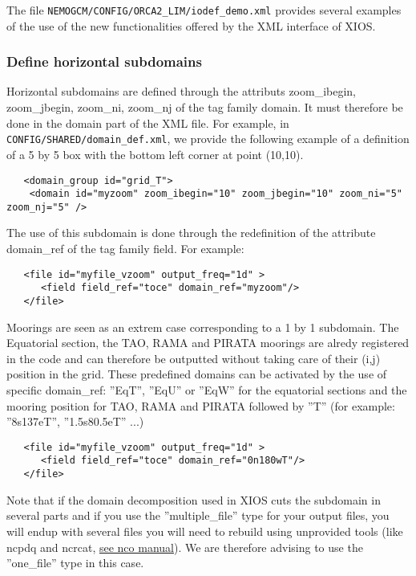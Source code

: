 \documentclass[NEMO_book]{subfiles}
\begin{document}
The file {\tt NEMOGCM/CONFIG/ORCA2\_LIM/iodef\_demo.xml} provides several examples of the use of the new functionalities offered by the XML interface of XIOS. 

\subsubsection{Define horizontal subdomains}
Horizontal subdomains are defined through the attributs zoom\_ibegin, zoom\_jbegin, zoom\_ni, zoom\_nj of the tag family domain. It must therefore be done in the domain part of the XML file. For example, in {\tt CONFIG/SHARED/domain\_def.xml}, we provide the following example of a definition of a 5 by 5 box with the bottom left corner at point (10,10).
\vspace{-20pt}
\begin{alltt}  {{\scriptsize
\begin{verbatim}
   <domain_group id="grid_T">
    <domain id="myzoom" zoom_ibegin="10" zoom_jbegin="10" zoom_ni="5" zoom_nj="5" />
\end{verbatim}
}}\end{alltt} 
The use of this subdomain is done through the redefinition of the attribute domain\_ref of the tag family field. For example:
\vspace{-20pt}
\begin{alltt}  {{\scriptsize
\begin{verbatim}
   <file id="myfile_vzoom" output_freq="1d" >
      <field field_ref="toce" domain_ref="myzoom"/>
   </file>
\end{verbatim}
}}\end{alltt} 
Moorings are seen as an extrem case corresponding to a 1 by 1 subdomain. The Equatorial section, the TAO, RAMA and PIRATA moorings are alredy registered in the code and can therefore be outputted without taking care of their (i,j) position in the grid. These predefined domains can be activated by the use of specific domain\_ref: ''EqT'', ''EqU'' or ''EqW'' for the equatorial sections and the mooring position for TAO, RAMA and PIRATA followed by ''T'' (for example: ''8s137eT'', ''1.5s80.5eT'' ...)
\vspace{-20pt}
\begin{alltt}  {{\scriptsize
\begin{verbatim}
   <file id="myfile_vzoom" output_freq="1d" >
      <field field_ref="toce" domain_ref="0n180wT"/>
   </file>
\end{verbatim}
}}\end{alltt} 
Note that if the domain decomposition used in XIOS cuts the subdomain in several parts and if you use the ''multiple\_file'' type for your output files, you will endup with several files you will need to rebuild using unprovided tools (like ncpdq and ncrcat, \href{http://nco.sourceforge.net/nco.html#Concatenation}{see nco manual}). We are therefore advising to use the ''one\_file'' type in this case.
\end{document}
